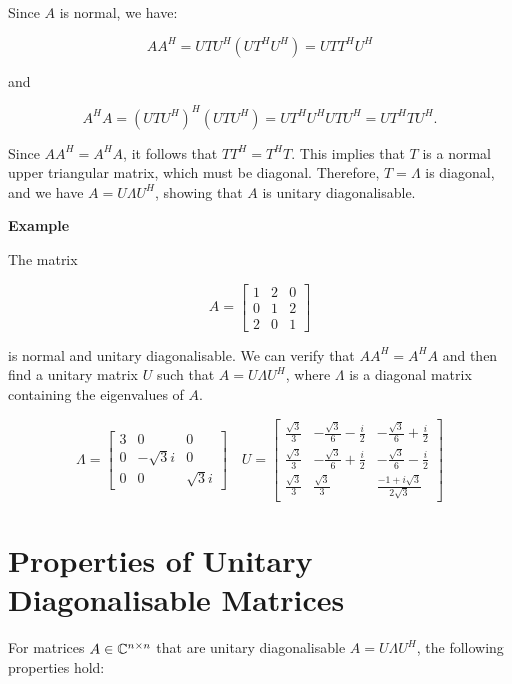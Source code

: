 Since \(A\) is normal, we have:

\[
    A A^H = U T U^H (U T^H U^H) = U T T^H U^H
\]

and 

\[
    A^H A = (U T U^H)^H (U T U^H) = U T^H U^H U T U^H = U T^H T U^H.
\]

Since \(A A^H = A^H A\), it follows that \(T T^H = T^H T\). This implies that \(T\) is a normal upper triangular 
matrix, which must be diagonal. Therefore, \(T = \Lambda\) is diagonal, and we have \(A = U \Lambda U^H\), showing that \(A\) 
is unitary diagonalisable.

\QED

\textbf{Example}

The matrix

\[
    A = 
    \begin{bmatrix}
        1 & 2 & 0 \\
        0 & 1 & 2 \\ 
        2 & 0 & 1
    \end{bmatrix}
\]

is normal and unitary diagonalisable. We can verify that \(A A^H = A^H A\) 
and then find a unitary matrix \(U\) such that \(A = U \Lambda U^H\), where \(\Lambda\) is a diagonal matrix containing the eigenvalues of \(A\).

\[
    \Lambda = 
    \begin{bmatrix}
        3 & 0 & 0 \\
        0 & -\sqrt{3}i & 0 \\
        0 & 0 & \sqrt{3}i
    \end{bmatrix}
    \quad 
    U = 
    \begin{bmatrix}
        \frac{\sqrt{3}}{3} & - \frac{\sqrt{3}}{6} - \frac{i}{2} & - \frac{\sqrt{3}}{6} + \frac{i}{2} \\
        \frac{\sqrt{3}}{3} & - \frac{\sqrt{3}}{6} + \frac{i}{2} & - \frac{\sqrt{3}}{6} - \frac{i}{2} \\
        \frac{\sqrt{3}}{3} & \frac{\sqrt{3}}{3}                 & \frac{-1 + i\sqrt{3}}{2\sqrt{3}}
    \end{bmatrix}
\]

\section{Properties of Unitary Diagonalisable Matrices}

For matrices \(A \in \mathbb{C}^{n \times n}\) that are unitary diagonalisable \(A = U \Lambda U^H\), the following properties hold:


